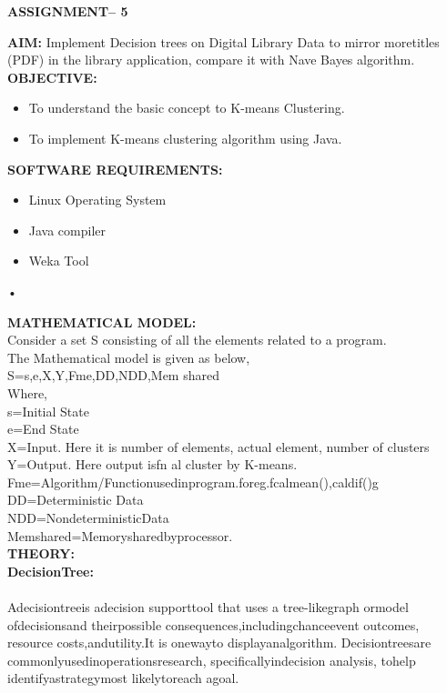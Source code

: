 \documentclass[11pt]{article}
\begin{document}
	
	\begin{center}
		\textbf{ASSIGNMENT– 5}
	\end{center}
	\textbf{AIM:}
	Implement Decision trees on Digital Library Data to mirror moretitles (PDF) in the library application, compare it with Nave Bayes algorithm. \\ 
	
	\noindent \textbf{OBJECTIVE:}
	\begin{itemize}
		\item To understand the basic concept to K-means Clustering.
		\item To implement K-means clustering algorithm using Java.
	\end{itemize}
	
	\noindent \textbf{SOFTWARE REQUIREMENTS:}
	\begin{itemize}
		\item Linux Operating System
		\item Java compiler
		\item Weka Tool
	\end{itemize}•
	
	\noindent \textbf{MATHEMATICAL MODEL:} \\
	Consider a set S consisting of all the elements related to a program. \\
	The Mathematical model is given as below, \\
	S={s,e,X,Y,Fme,DD,NDD,Mem shared} \\
	Where, \\
	s=Initial State \\
	e=End State \\
	X=Input. Here it is number of elements, actual element, number of clusters \\
	Y=Output. Here output isfn al cluster by K-means. \\
	Fme=Algorithm/Functionusedinprogram.foreg.fcalmean(),caldif()g
	DD=Deterministic Data \\
	NDD=NondeterministicData \\
	Memshared=Memorysharedbyprocessor. \\
	
	\noindent \textbf{THEORY:} \\
	
	\textbf{DecisionTree:} \\
	\paragraph{}
	Adecisiontreeis adecision supporttool that uses a tree-likegraph ormodel
	ofdecisionsand theirpossible consequences,includingchanceevent outcomes, resource
	costs,andutility.It is onewayto displayanalgorithm.
	Decisiontreesare commonlyusedinoperationsresearch, specificallyindecision analysis, tohelp
	identifyastrategymost likelytoreach agoal. \\
	
\end{document}
